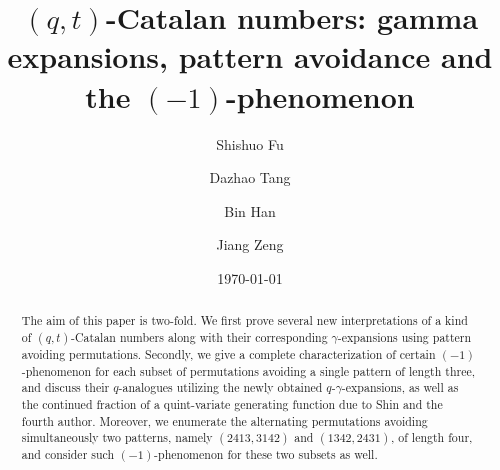 \documentclass[12pt,reqno]{amsart}
\numberwithin{equation}{section}
\theoremstyle{plain}
\theoremstyle{definition}
\begin{document}
\title[Gamma expansions, pattern avoidance and the $(-1)$-phenomenon]{$(q,t)$-Catalan numbers:
gamma expansions, pattern avoidance and the $(-1)$-phenomenon}


\author[S. Fu]{Shishuo Fu}
\address[Shishuo Fu]{College of Mathematics and Statistics, Chongqing University, Huxi campus LD506, Chongqing 401331, P.R. China}


\author[D. Tang]{Dazhao Tang}

\address[Dazhao Tang]{College of Mathematics and Statistics, Chongqing University, Huxi campus LD206, Chongqing 401331, P.R. China}

\author[B. Han]{Bin Han}

\address[Bin Han]{Univ Lyon, Universit\'e Claude Bernard Lyon 1, CNRS UMR 5208, Institut Camille Jordan, 43 blvd. du 11 novembre 1918, F-69622 Villeurbanne cedex, France}


\author[J. Zeng]{Jiang Zeng}

\address[Jiang Zeng]{Univ Lyon, Universit\'e Claude Bernard Lyon 1, CNRS UMR 5208, Institut Camille Jordan, 43 blvd. du 11 novembre 1918, F-69622 Villeurbanne cedex, France}

\date{\today}

\begin{abstract}
The aim of this paper is two-fold. We first prove several new interpretations of a kind of $(q,t)$-Catalan numbers along with their corresponding $\gamma$-expansions using pattern avoiding permutations. Secondly, we give a complete characterization of certain $(-1)$-phenomenon for each subset of permutations avoiding a single pattern of length three, and discuss their $q$-analogues utilizing the newly obtained $q$-$\gamma$-expansions, as well as the continued fraction of a quint-variate generating function due to Shin and the fourth author. Moreover, we enumerate the alternating permutations avoiding simultaneously two patterns, namely $(2413,3142)$ and $(1342,2431)$, of length four, and consider such $(-1)$-phenomenon for these two subsets as well.
\end{abstract}



\maketitle
\end{document}
